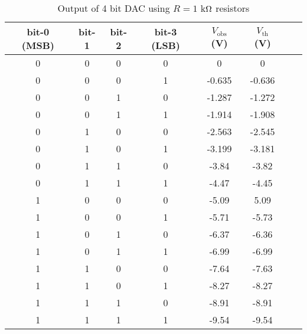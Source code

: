 \begin{table}[H]
    \centering
    \begin{tabular}{|c|c|c|c|c|c|c|c|}
        \hline
        bit-0 (MSB) & bit-1 & bit-2 & bit-3 (LSB) & $V_\text{obs}$ (V)& $ V_\text{th}$ (V) \\ \hline
0 & 0           & 0     & 0           & 0      & 0\\ \hline
0 & 0           & 0     & 1           & -0.635        & -0.636\\ \hline
0 & 0           & 1     & 0           & -1.287        & -1.272 \\ \hline
0 & 0           & 1     & 1           & -1.914        & -1.908\\ \hline
0 & 1           & 0     & 0           & -2.563        & -2.545\\ \hline
0 & 1           & 0     & 1           & -3.199         & -3.181\\ \hline
0 & 1           & 1     & 0           & -3.84        & -3.82\\ \hline
0 & 1           & 1     & 1           & -4.47         & -4.45\\ \hline

1& 0           & 0     & 0           & -5.09 & 5.09\\ \hline
1& 0           & 0     & 1           & -5.71        & -5.73\\ \hline
1& 0           & 1     & 0           & -6.37        & -6.36\\ \hline
1& 0           & 1     & 1           & -6.99        & -6.99\\ \hline
1& 1           & 0     & 0           & -7.64         & -7.63\\ \hline
1& 1           & 0     & 1           & -8.27         & -8.27\\ \hline
1& 1           & 1     & 0           & -8.91         & -8.91\\ \hline
1& 1           & 1     & 1           & -9.54         & -9.54\\ \hline
    \end{tabular}
    \caption{Output of 4 bit DAC using $R=1$ k$\ohm$ resistors}
    \label{tab:1.5}
\end{table}
